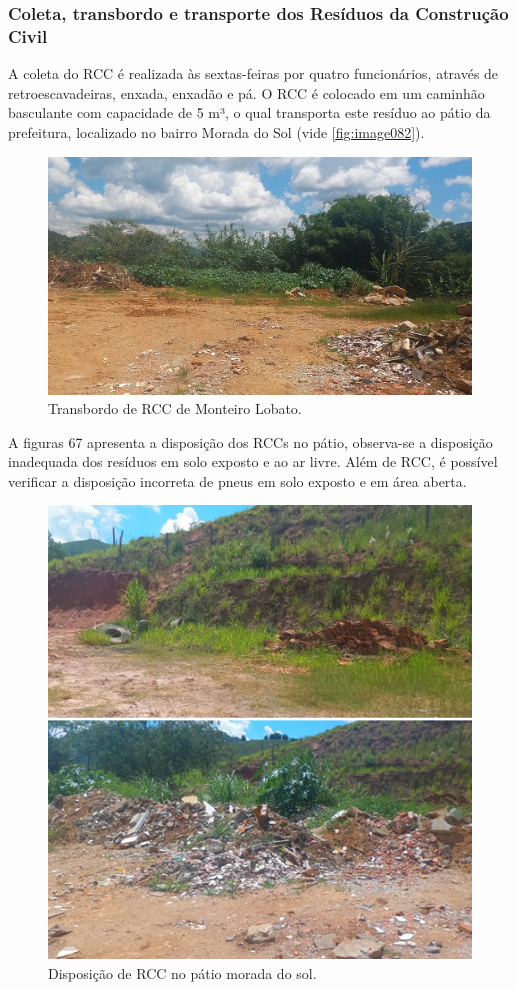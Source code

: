	
	\subsubsection{Coleta, transbordo e transporte dos Resíduos da Construção Civil}
	A coleta do RCC é realizada às sextas-feiras por quatro funcionários, através de retroescavadeiras, enxada, enxadão e pá. O RCC é colocado em um caminhão basculante com capacidade de 5 m³, o qual transporta este resíduo ao pátio da prefeitura, localizado no bairro Morada do Sol (vide \autoref{fig:image082}).
	
	\begin{figure}
		\centering
		\includegraphics[width=0.7\linewidth]{produtos/prodtres/image082}
		\caption{Transbordo de RCC de Monteiro Lobato.}
		\label{fig:image082}
	\end{figure}
	
	
	A figuras 67 apresenta a disposição dos RCCs no pátio, observa-se a disposição inadequada dos resíduos em solo exposto e ao ar livre. Além de RCC, é possível verificar a disposição incorreta de pneus em solo exposto e em área aberta.

	\begin{figure}
		\centering
		\includegraphics[width=0.7\linewidth]{produtos/prodtres/image083}
		\caption{Disposição de RCC no pátio morada do sol.}
		\label{fig:image083}
	\end{figure}
	
